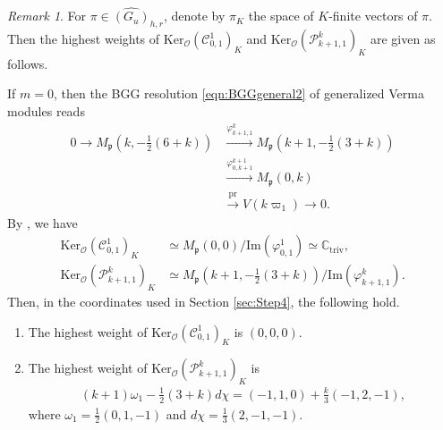 \documentclass[reqno,11pt]{amsart}
\theoremstyle{remark}
\newtheorem{rem}[equation]{Remark}
\numberwithin{equation}{section}
\newcommand{\fp}{{\mathfrak p}}
\newcommand{\C}{\mathbb{C}}
\newcommand{\Cal}{\mathcal}
\renewcommand{\Im}{\mathrm{Im}}
\newcommand{\To}{\longrightarrow}
\newcommand{\triv}{\mathrm{triv}}
\newcommand{\pr}{\mathrm{pr}}
\newcommand{\Ker}{\mathrm{Ker}}
\begin{document}

\begin{rem}\label{rem:78}
For $\pi \in \widehat{(G_u)}_{h,r}$, denote by $\pi_K$ the space of $K$-finite vectors of $\pi$.
Then the highest weights of 
$\Ker_{\Cal{O}}(\Cal{C}^{1}_{0,1})_K$ and 
$\Ker_{\Cal{O}}(\Cal{P}^{k}_{k+1,1})_K$ are given as follows.

If $m=0$, then the BGG resolution \eqref{eqn:BGGgeneral2} of generalized Verma modules
reads
\begin{equation*}
\begin{aligned}
0
\To M_\fp(k, -\tfrac{1}{2}(6+k))
&\stackrel{\varphi^{k}_{k+1,1}}{\To}
M_\fp(k+1, -\tfrac{1}{2}(3+k))\\[5pt]
&\stackrel{\varphi^{k+1}_{0,k+1}}{\To}
M_\fp(0, k)\\[5pt]
&\stackrel{\pr}{\To}
V(k\varpi_1)
\To 0.
\end{aligned}
\end{equation*}
By \cite[Thms.\ 2.4 and 3.2]{DES90}, we have 
\begin{align*}
\Ker_{\Cal{O}}(\Cal{C}^{1}_{0,1})_K
&\simeq 
M_\fp(0,0)/\Im (\varphi^1_{0,1}) \simeq \C_{\triv}, \\[3pt]
\Ker_{\Cal{O}}(\Cal{P}^{k}_{k+1,1})_K
&\simeq
M_\fp(k+1,-\tfrac{1}{2}(3+k))/\Im (\varphi^k_{k+1,1}).
\end{align*}
Then, in the coordinates used in Section \ref{sec:Step4}, the following hold.

\begin{enumerate}[(1)]
\item The highest weight of 
$\Ker_{\Cal{O}}(\Cal{C}^{1}_{0,1})_K$ is $(0,0,0)$.
\vskip 0.1in

\item The highest weight of $\Ker_{\Cal{O}}(\Cal{P}^{k}_{k+1,1})_K$ is
\begin{align*}
(k+1)\omega_1-\frac{1}{2}(3+k)d\chi = (-1,1,0)+\frac{k}{3}(-1,2,-1),
\end{align*}
where $\omega_1=\frac{1}{2}(0,1,-1)$ and $d\chi=\frac{1}{3}(2,-1,-1)$.
\end{enumerate}
\end{rem}

\end{document}
